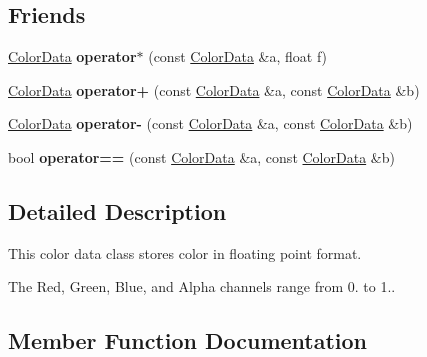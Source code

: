 \subsection*{Friends}
\begin{DoxyCompactItemize}
\item 
\hyperlink{classimage__tools_1_1ColorData}{Color\+Data} {\bfseries operator$\ast$} (const \hyperlink{classimage__tools_1_1ColorData}{Color\+Data} \&a, float f)\hypertarget{classimage__tools_1_1ColorData_adf9a770243996e50282d248a4327f351}{}\label{classimage__tools_1_1ColorData_adf9a770243996e50282d248a4327f351}

\item 
\hyperlink{classimage__tools_1_1ColorData}{Color\+Data} {\bfseries operator+} (const \hyperlink{classimage__tools_1_1ColorData}{Color\+Data} \&a, const \hyperlink{classimage__tools_1_1ColorData}{Color\+Data} \&b)\hypertarget{classimage__tools_1_1ColorData_afee00faf26189979b72f3854a17200ae}{}\label{classimage__tools_1_1ColorData_afee00faf26189979b72f3854a17200ae}

\item 
\hyperlink{classimage__tools_1_1ColorData}{Color\+Data} {\bfseries operator-\/} (const \hyperlink{classimage__tools_1_1ColorData}{Color\+Data} \&a, const \hyperlink{classimage__tools_1_1ColorData}{Color\+Data} \&b)\hypertarget{classimage__tools_1_1ColorData_a799bd54f65a61569b5b968062ac0d37e}{}\label{classimage__tools_1_1ColorData_a799bd54f65a61569b5b968062ac0d37e}

\item 
bool {\bfseries operator==} (const \hyperlink{classimage__tools_1_1ColorData}{Color\+Data} \&a, const \hyperlink{classimage__tools_1_1ColorData}{Color\+Data} \&b)\hypertarget{classimage__tools_1_1ColorData_a9dae9e77610393d100312c9d248f09cc}{}\label{classimage__tools_1_1ColorData_a9dae9e77610393d100312c9d248f09cc}

\end{DoxyCompactItemize}


\subsection{Detailed Description}
This color data class stores color in floating point format. 

The Red, Green, Blue, and Alpha channels range from 0. to 1.. 

\subsection{Member Function Documentation}
